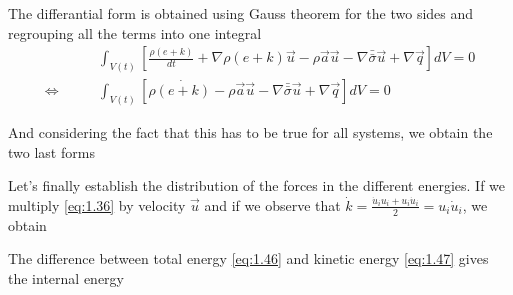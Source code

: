 		The differantial form is obtained using Gauss theorem for the two sides and regrouping all the terms into one integral
		\begin{equation}
		\begin{aligned}
			&\int _{V(t)} \left[\frac{\rho (e+k)}{dt} + \nabla \rho (e+k)\vec{u} - \rho \vec{a} \vec{u} - \nabla \bar{\bar{\sigma}}\vec{u} + \nabla \vec{q} \right] dV = 0 \\
			\Leftrightarrow \qquad &\int _{V(t)} \left[\rho\dot{(e+k)} - \rho \vec{a} \vec{u} - \nabla \bar{\bar{\sigma}}\vec{u} + \nabla \vec{q} \right] dV = 0
		\end{aligned}
		\end{equation}
		
		And considering the fact that this has to be true for all systems, we obtain the two last forms
		\begin{center}
		\end{center}
		\begin{center}
		\end{center}
		Let's finally establish the distribution of the forces in the different energies. If we multiply \eqref{eq:1.36} by velocity $\vec{u}$ and if we observe that $\dot{k} = \frac{\dot{u}_i u_i+u_i\dot{u}_i}{2} = u_i \dot{u}_i$, we obtain 
		
		\begin{center}
		\end{center}
		The difference between total energy \eqref{eq:1.46} and kinetic energy \eqref{eq:1.47} gives the internal energy
		
